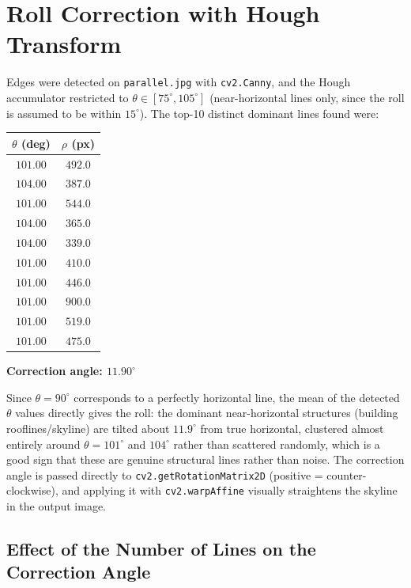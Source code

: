 \documentclass[11pt]{article}
\begin{document}
\section{Roll Correction with Hough Transform}

Edges were detected on \texttt{parallel.jpg} with \texttt{cv2.Canny}, and the Hough
accumulator restricted to $\theta\in[75^\circ,105^\circ]$ (near-horizontal lines only, since
the roll is assumed to be within $15^\circ$). The top-10 distinct dominant lines found were:

\begin{center}
\begin{tabular}{cc}
\toprule
$\theta$ (deg) & $\rho$ (px) \\
\midrule
$101.00$ & $492.0$ \\
$104.00$ & $387.0$ \\
$101.00$ & $544.0$ \\
$104.00$ & $365.0$ \\
$104.00$ & $339.0$ \\
$101.00$ & $410.0$ \\
$101.00$ & $446.0$ \\
$101.00$ & $900.0$ \\
$101.00$ & $519.0$ \\
$101.00$ & $475.0$ \\
\bottomrule
\end{tabular}
\end{center}

\begin{center}
\textbf{Correction angle: $11.90^\circ$}
\end{center}

Since $\theta=90^\circ$ corresponds to a perfectly horizontal line, the mean of the detected
$\theta$ values directly gives the roll: the dominant near-horizontal structures (building
rooflines/skyline) are tilted about $11.9^\circ$ from true horizontal, clustered almost
entirely around $\theta=101^\circ$ and $104^\circ$ rather than scattered randomly, which is
a good sign that these are genuine structural lines rather than noise. The correction angle
is passed directly to \texttt{cv2.getRotationMatrix2D} (positive = counter-clockwise), and
applying it with \texttt{cv2.warpAffine} visually straightens the skyline in the output
image.

\subsection*{Effect of the Number of Lines on the Correction Angle}
\end{document}
